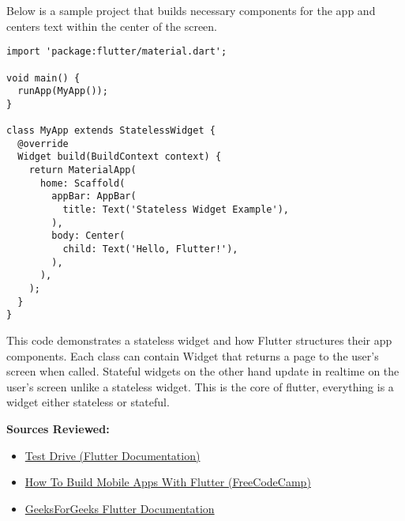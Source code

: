 \documentclass{article}
\begin{document}
Below is a sample project that builds necessary components for the app and centers text within the center of the screen.

\begin{lstlisting}
import 'package:flutter/material.dart';

void main() {
  runApp(MyApp());
}

class MyApp extends StatelessWidget {
  @override
  Widget build(BuildContext context) {
    return MaterialApp(
      home: Scaffold(
        appBar: AppBar(
          title: Text('Stateless Widget Example'),
        ),
        body: Center(
          child: Text('Hello, Flutter!'),
        ),
      ),
    );
  }
}
\end{lstlisting}

This code demonstrates a stateless widget and how Flutter structures their app components. Each class can contain Widget that returns a page to the user's screen when called. Stateful widgets on the other hand update in realtime on the user's screen unlike a stateless widget. This is the core of flutter, everything is a widget either stateless or stateful. 

\textbf{Sources Reviewed:}

\begin{itemize}
	\item \href{https://docs.flutter.dev/get-started/test-drive}{Test Drive (Flutter Documentation)}
	\item \href{https://www.freecodecamp.org/news/how-to-build-mobile-apps-with-flutter/}{How To Build Mobile Apps With Flutter (FreeCodeCamp)}
	\item \href{https://www.geeksforgeeks.org/flutter-tutorial/}{GeeksForGeeks Flutter Documentation}
\end{itemize}
\end{document}
